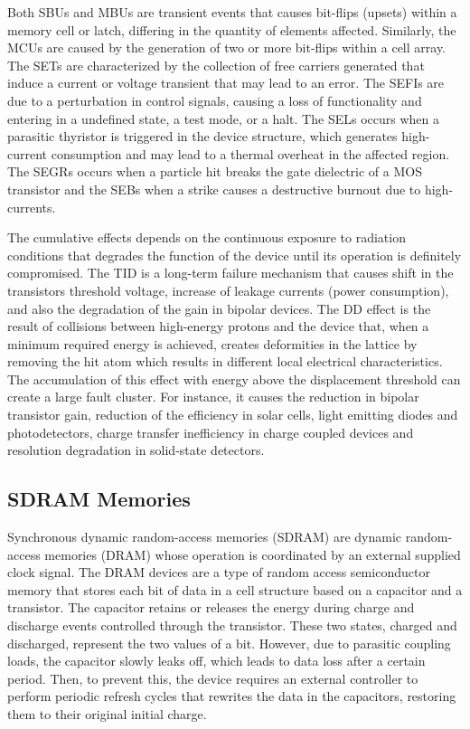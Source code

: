 Both SBUs and MBUs are transient events that causes bit-flips (upsets) within a memory cell or latch, differing in the quantity of elements affected. Similarly, the MCUs are caused by the generation of two or more bit-flips within a cell array. The SETs are characterized by the collection of free carriers generated that induce a current or voltage transient that may lead to an error. The SEFIs are due to a perturbation in control signals, causing a loss of functionality and entering in a undefined state, a test mode, or a halt. The SELs occurs when a parasitic thyristor is triggered in the device structure, which generates high-current consumption and may lead to a thermal overheat in the affected region. The SEGRs occurs when a particle hit breaks the gate dielectric of a MOS transistor and the SEBs when a strike causes a destructive burnout due to high-currents.

The cumulative effects depends on the continuous exposure to radiation conditions that degrades the function of the device until its operation is definitely compromised. The TID is a long-term failure mechanism that causes shift in the transistors threshold voltage, increase of leakage currents (power consumption), and also the degradation of the gain in bipolar devices. The DD effect is the result of collisions between high-energy protons and the device that, when a minimum required energy is achieved, creates deformities in the lattice by removing the hit atom which results in different local electrical characteristics. The accumulation of this effect with energy above the displacement threshold can create a large fault cluster. For instance, it causes the reduction in bipolar transistor gain, reduction of the efficiency in solar cells, light emitting diodes and photodetectors, charge transfer inefficiency in charge coupled devices and resolution degradation in solid-state detectors.


\subsection{SDRAM Memories}

Synchronous dynamic random-access memories (SDRAM) are dynamic random-access memories (DRAM) whose operation is coordinated by an external supplied clock signal. The DRAM devices are a type of random access semiconductor memory that stores each bit of data in a cell structure based on a capacitor and a transistor. The capacitor retains or releases the energy during charge and discharge events controlled through the transistor. These two states, charged and discharged, represent the two values of a bit. However, due to parasitic coupling loads, the capacitor slowly leaks off, which leads to data loss after a certain period. Then, to prevent this, the device requires an external controller to perform periodic refresh cycles that rewrites the data in the capacitors, restoring them to their original initial charge.

